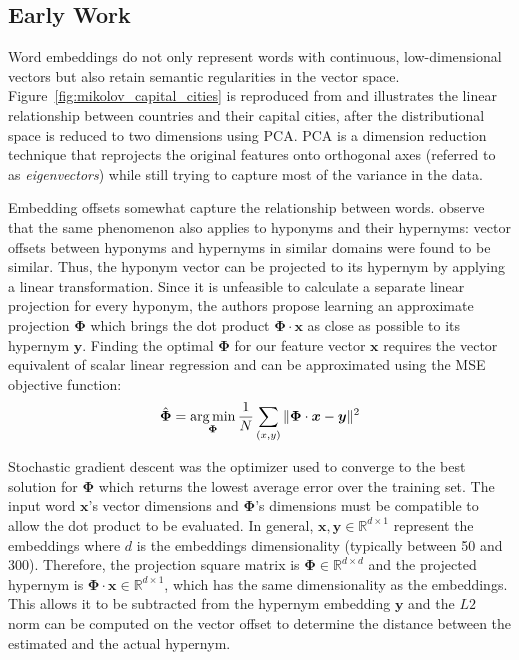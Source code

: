 \subsection{Early Work}
Word embeddings do not only represent words with continuous, low-dimensional vectors but also retain semantic regularities in the vector space.  Figure~\ref{fig:mikolov_capital_cities} is reproduced from \citep{mikolov2013distributed} and illustrates the linear relationship between countries and their capital cities, after the distributional space is reduced to two dimensions using \ac{PCA}.  \ac{PCA} is a dimension reduction technique that reprojects the original features onto orthogonal axes (referred to as \textit{eigenvectors}) while still trying to capture most of the variance in the data.

Embedding offsets somewhat capture the relationship between words.  \citet{Fu2014} observe that the same phenomenon also applies to hyponyms and their hypernyms: vector offsets between hyponyms and hypernyms in similar domains were found to be similar.  Thus, the hyponym vector can be projected to its hypernym by applying a linear transformation.  Since it is unfeasible to calculate a separate linear projection for every hyponym, the authors propose learning an approximate projection $\bm{\Phi}$ which brings the dot product $\bm{\Phi} \cdot \bm{x}$ as close as possible to its hypernym $\bm{y}$.  Finding the optimal $\bm{\Phi}$ for our feature vector $\bm{x}$ requires the vector equivalent of scalar linear regression and can be approximated using the \ac{MSE} objective function:
\[\hat{\bm{\Phi}} = \operatorname*{arg\,min}_{\bm{\Phi}} \frac{1}{N} \sum_{(x,y)} \Vert \bm{\Phi}\cdot\bm{x} - \bm {y} \Vert^2 \]

Stochastic gradient descent was the optimizer used to converge to the best solution for $\bm{\Phi}$ which returns the lowest average error over the training set.  The input word $\bm{x}$’s vector dimensions and $\bm{\Phi}$'s dimensions must be compatible to allow the dot product to be evaluated.  In general, $\bm{x}, \bm{y} \in \mathbb{R}^{d \times 1}$ represent the embeddings where $d$ is the embeddings dimensionality (typically between 50 and 300).  Therefore, the projection square matrix is $\bm{\Phi} \in \mathbb{R}^{d \times d}$ and the projected hypernym is $\bm{\Phi} \cdot \bm{x} \in \mathbb{R}^{d \times 1}$, which has the same dimensionality as the embeddings.  This allows it to be subtracted from the hypernym embedding $\bm{y}$ and the $L2$ norm can be computed on the vector offset to determine the distance between the estimated and the actual hypernym.  

